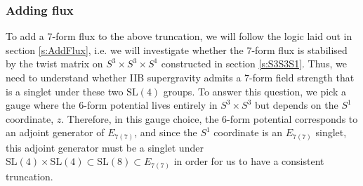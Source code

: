 \documentclass[a4paper, 11pt]{article}
\numberwithin{equation}{section}
\newcommand{\SL}[1]{\mathrm{SL}( #1 )}
\newcommand{\En}[1]{E_{#1(#1)}}
\newcommand{\+}{\oplus}
\begin{document}
\subsubsection{Adding flux}
To add a 7-form flux to the above truncation, we will follow the logic laid out in section \ref{s:AddFlux}, i.e. we will investigate whether the 7-form flux is stabilised by the twist matrix on $S^3 \times S^3 \times S^1$ constructed in section \ref{s:S3S3S1}. Thus, we need to understand 
whether IIB supergravity admits a 7-form field strength that is a singlet under these two $\SL{4}$ groups. To answer this question, we pick a gauge where the 6-form potential lives entirely in $S^3 \times S^3$ but depends on the $S^1$ coordinate, $z$. Therefore, in this gauge choice, the 6-form potential corresponds to an adjoint generator of $\En{7}$, and since the $S^1$ coordinate is an $\En{7}$ singlet, this adjoint generator must be a singlet under $\SL{4} \times \SL{4} \subset \SL{8} \subset \En{7}$ in order for us to have a consistent truncation.
\end{document}
